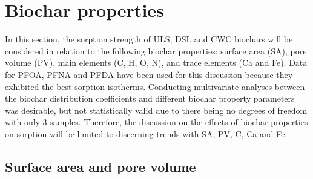 
\section{Biochar properties}
In this section, the sorption strength of ULS, DSL and CWC biochars will be considered in relation to the following biochar properties: surface area (\acrshort{SA}), pore volume (\acrshort{PV}), main elements (C, H, O, N), and trace elements (Ca and Fe). Data for PFOA, PFNA and PFDA have been used for this discussion because they exhibited the best sorption isotherms. Conducting multivariate analyses between the biochar distribution coefficients and different biochar property parameters was desirable, but not statistically valid due to there being no degrees of freedom with only 3 samples. Therefore, the discussion on the effects of biochar properties on sorption will be limited to discerning trends with SA, PV, C, Ca and Fe. 

\subsection{Surface area and pore volume}\label{sec:SAPV}

